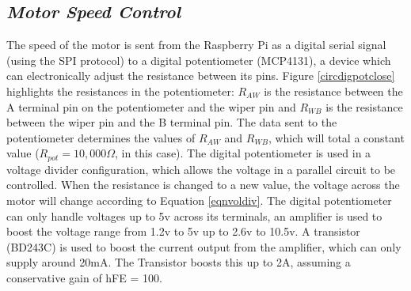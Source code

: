 \documentclass[a4]{report}
\begin{document}
	\subsection{\textit{Motor Speed Control}}
	The speed of the motor is sent from the Raspberry Pi as a digital serial signal (using the SPI protocol) to a digital potentiometer (MCP4131), a device which can electronically adjust the resistance between its pins. Figure \ref{circdigpotclose} highlights the resistances in the potentiometer: \(R_{AW}\) is the resistance between the A terminal pin on the potentiometer and the wiper pin and \(R_{WB}\) is the resistance between the wiper pin and the B terminal pin. The data sent to the potentiometer determines the values of \(R_{AW}\) and \(R_{WB}\), which will total a constant value (\(R_{pot} = 10,000\Omega \), in this case). The digital potentiometer is used in a voltage divider configuration, which allows the voltage in a parallel circuit to be controlled. When the resistance is changed to a new value, the voltage across the motor will change according to Equation \ref{eqnvoldiv}. The digital potentiometer can only handle voltages up to 5v across its terminals, an amplifier is used to boost the voltage range from 1.2v to 5v up to 2.6v to 10.5v. A transistor (BD243C) is used to boost the current output from the amplifier, which can only supply around 20mA. The Transistor boosts this up to 2A, assuming a conservative gain of hFE = 100.\newline
	
\end{document}
